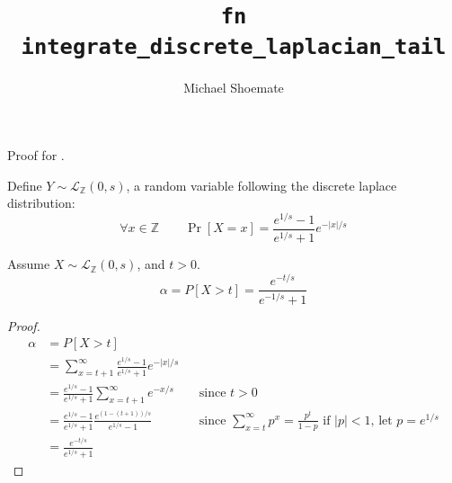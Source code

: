 \documentclass{article}
\title{\texttt{fn integrate\_discrete\_laplacian\_tail}}
\author{Michael Shoemate}
\begin{document}
\maketitle

\contrib

Proof for .

\begin{definition}
    Define $Y \sim \mathcal{L}_\mathbb{Z}(0, s)$, a random variable following the discrete laplace distribution:
    \begin{equation}
        \forall x \in \mathbb{Z} \qquad \Pr[X = x] = \frac{e^{1/s} - 1}{e^{1/s} + 1} e^{-|x|/s}
    \end{equation}
\end{definition}

\begin{theorem}
    Assume $X \sim \mathcal{L}_\mathbb{Z}(0, s)$, and $t > 0$.
    \begin{equation}
        \alpha = P[X > t] = \frac{e^{-t/s}}{e^{-1/s} + 1}
    \end{equation}
\end{theorem}

\begin{proof}
    \begin{align*}
        \alpha &= P[X > t] \\
        &= \sum_{x=t + 1}^{\infty} \frac{e^{1/s} - 1}{e^{1/s} + 1} e^{-|x|/s} \\
        &= \frac{e^{1/s} - 1}{e^{1/s} + 1} \sum_{x=t + 1}^{\infty} e^{-x/s} 
            && \text{since } t > 0 \\
        &= \frac{e^{1/s} - 1}{e^{1/s} + 1} \frac{e^{(1-(t + 1))/s}}{e^{1/s} - 1} 
            && \text{since } \sum_{x=t}^\infty p^x = \frac{p^t}{1 - p} \text{ if } |p| < 1 \text{, let } p = e^{1/s}\\
        &= \frac{e^{-t/s}}{e^{1/s} + 1}
    \end{align*}

\end{proof}
\end{document}
